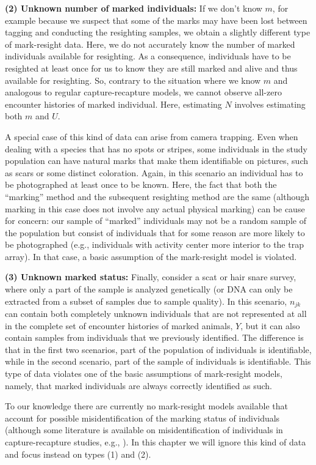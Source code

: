 \textbf{(2) Unknown number of marked individuals:}
If we don't know $m$, for example because we suspect that some of the marks may have been
lost
between
tagging and conducting the resighting samples, we obtain a slightly
different type of mark-resight data. Here, we do not accurately know the
number of marked individuals available for resighting. As a
consequence, individuals have to be resighted at least once for us to
know they are still marked and alive and thus available for
resighting. So, contrary to the situation where we know $m$ and
analogous to regular capture-recapture models, we cannot observe
all-zero encounter histories of marked individual. Here, estimating
$N$ involves estimating both $m$ and $U$.

A special case of this kind of data can arise from camera
trapping. Even when dealing with a species that has no spots or
stripes, some individuals in the study population can have natural
marks that make them identifiable on pictures, such as scars or some
distinct coloration. Again, in this scenario an individual has to be
photographed at least once to be known. Here, the fact that both the
``marking'' method and the subsequent resighting method are the same
(although marking in this case does not involve any actual physical
marking) can be cause for concern: our sample of ``marked''
individuals may not be a random sample of the population but consist
of individuals that for some reason are more likely to be
photographed (e.g., individuals with activity center more interior to
the trap array). In that case, a basic assumption of the mark-resight
model is violated.

\textbf{(3) Unknown marked status:}
Finally, consider a scat or hair snare survey, where only a part of
the sample is analyzed genetically (or DNA can only be extracted
from a subset of samples due to sample quality). In this scenario,
$n_{jk}$ can contain both completely unknown individuals that are
not represented at all in the complete set of encounter histories of marked animals,
{\bf $Y$},
but it can also contain samples
from individuals that we previously identified. The difference is that
in the first two scenarios, part of the population of individuals is
identifiable, while in the second scenario, part of the
sample of individuals is identifiable. This type of data
violates one of the basic assumptions of mark-resight models,
namely, that marked individuals are always correctly identified as
such.

To our knowledge there are currently no mark-resight models available
that account for possible misidentification of the marking status of
individuals (although some literature is available on
misidentification of individuals in capture-recapture studies, e.g.,
\citealp{yoshizaki_etal:2009, lukacs_burnham:2005,
  link_etal:2010}). In this chapter we will ignore this kind of data
and focus instead on %
types (1) and (2).

